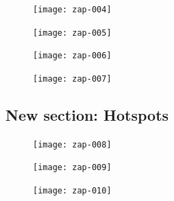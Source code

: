 \documentclass[12pt]{article}
\begin{document}
\begin{figure}[H]
\begin{center}
\texttt{[image: zap-004]}
\end{center}
\end{figure}
\vspace{-10mm}


\begin{figure}[H]
\begin{center}
\texttt{[image: zap-005]}
\end{center}
\end{figure}
\vspace{-10mm}


\begin{figure}[H]
\begin{center}
\texttt{[image: zap-006]}
\end{center}
\end{figure}

\vspace{-10mm}

\begin{figure}[H]
\begin{center}
\texttt{[image: zap-007]}
\end{center}
\end{figure}



\begin{center}
\section*{New section: Hotspots}
\end{center}
\begin{figure}[H]
\begin{center}
\texttt{[image: zap-008]}
\end{center}
\end{figure}
\vspace{-10mm}


\begin{figure}[H]
\begin{center}
\texttt{[image: zap-009]}
\end{center}
\end{figure}
\vspace{-10mm}

\begin{figure}[H]
\begin{center}
\texttt{[image: zap-010]}
\end{center}
\end{figure}
\vspace{-10mm}
\end{document}

